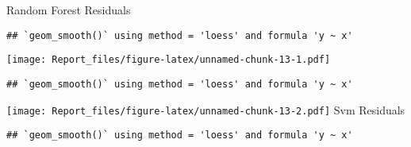 \documentclass[]{article}
\newenvironment{Shaded}{\begin{snugshade}}{\end{snugshade}}
\newcommand{\KeywordTok}[1]{\textcolor[rgb]{0.13,0.29,0.53}{\textbf{#1}}}
\newcommand{\DataTypeTok}[1]{\textcolor[rgb]{0.13,0.29,0.53}{#1}}
\newcommand{\StringTok}[1]{\textcolor[rgb]{0.31,0.60,0.02}{#1}}
\newcommand{\OperatorTok}[1]{\textcolor[rgb]{0.81,0.36,0.00}{\textbf{#1}}}
\newcommand{\NormalTok}[1]{#1}
\begin{document}
 Random Forest Residuals

\begin{Shaded}
\end{Shaded}

\begin{verbatim}
## `geom_smooth()` using method = 'loess' and formula 'y ~ x'
\end{verbatim}

\texttt{[image: Report\_files/figure-latex/unnamed-chunk-13-1.pdf]}

\begin{Shaded}
\end{Shaded}

\begin{verbatim}
## `geom_smooth()` using method = 'loess' and formula 'y ~ x'
\end{verbatim}

\texttt{[image: Report\_files/figure-latex/unnamed-chunk-13-2.pdf]} Svm
Residuals

\begin{Shaded}
\end{Shaded}

\begin{verbatim}
## `geom_smooth()` using method = 'loess' and formula 'y ~ x'
\end{verbatim}
\end{document}
